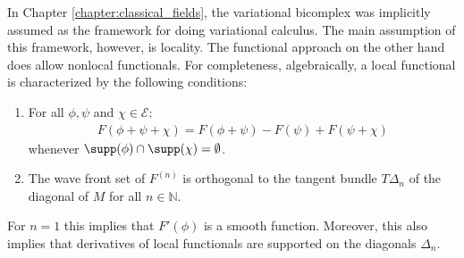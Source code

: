     \begin{remark}
        In Chapter \ref{chapter:classical_fields}, the variational bicomplex was implicitly assumed as the framework for doing variational calculus. The main assumption of this framework, however, is locality. The functional approach on the other hand does allow nonlocal functionals. For completeness, algebraically, a local functional is characterized by the following conditions:
        \begin{enumerate}
            \item For all $\phi,\psi$ and $\chi\in\mathcal{E}$:
                \begin{gather}
                    F(\phi+\psi+\chi)=F(\phi+\psi)-F(\psi)+F(\psi+\chi)
                \end{gather}
                whenever $\supp(\phi)\cap\supp(\chi)=\emptyset$.
            \item The wave front set of $F^{(n)}$ is orthogonal to the tangent bundle $T\Delta_n$ of the diagonal of $M$ for all $n\in\mathbb{N}$.
        \end{enumerate}
        For $n=1$ this implies that $F'(\phi)$ is a smooth function. Moreover, this also implies that derivatives of local functionals are supported on the diagonals $\Delta_n$.
    \end{remark}

